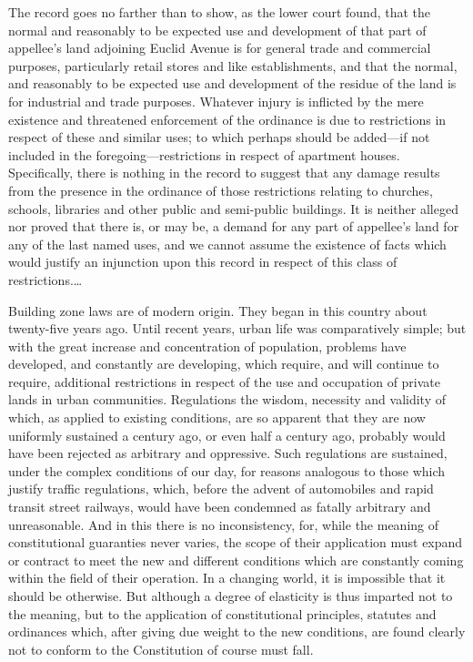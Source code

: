 The record goes no farther than to show, as the lower court found, that the
normal and reasonably to be expected use and development of that part of
appellee's land adjoining Euclid Avenue is for general trade and commercial
purposes, particularly retail stores and like establishments, and that the
normal, and reasonably to be expected use and development of the residue of the
land is for industrial and trade purposes. Whatever injury is inflicted by the
mere existence and threatened enforcement of the ordinance is due to
restrictions in respect of these and similar uses; to which perhaps should be
added---if not included in the foregoing---restrictions in respect of apartment
houses. Specifically, there is nothing in the record to suggest that any damage
results from the presence in the ordinance of those restrictions relating to
churches, schools, libraries and other public and semi-public buildings. It is
neither alleged nor proved that there is, or may be, a demand for any part of
appellee's land for any of the last named uses, and we cannot assume the
existence of facts which would justify an injunction upon this record in respect
of this class of restrictions.\ldots

Building zone laws are of modern origin. They began in this country about
twenty-five years ago. Until recent years, urban life was comparatively simple;
but with the great increase and concentration of population, problems have
developed, and constantly are developing, which require, and will continue to
require, additional restrictions in respect of the use and occupation of private
lands in urban communities. Regulations the wisdom, necessity and validity of
which, as applied to existing conditions, are so apparent that they are now
uniformly sustained a century ago, or even half a century ago, probably would
have been rejected as arbitrary and oppressive. Such regulations are sustained,
under the complex conditions of our day, for reasons analogous to those which
justify traffic regulations, which, before the advent of automobiles and rapid
transit street railways, would have been condemned as fatally arbitrary and
unreasonable. And in this there is no inconsistency, for, while the meaning of
constitutional guaranties never varies, the scope of their application must
expand or contract to meet the new and different conditions which are constantly
coming within the field of their operation. In a changing world, it is
impossible that it should be otherwise. But although a degree of elasticity is
thus imparted not to the meaning, but to the application of constitutional
principles, statutes and ordinances which, after giving due weight to the new
conditions, are found clearly not to conform to the Constitution of course must
fall.


